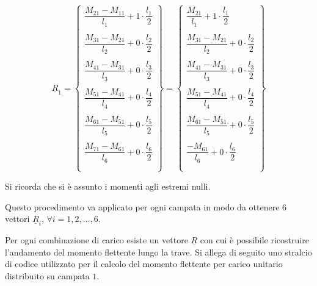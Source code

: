 \begin{equation*}
 \underline{R}_1 = \begin{Bmatrix}
    \dfrac{M_{21} - M_{11}}{l_1} + 1\cdot\dfrac{l_1}{2}\\\\
    \dfrac{M_{31} - M_{21}}{l_2} + 0\cdot\dfrac{l_2}{2}\\\\
    \dfrac{M_{41} - M_{31}}{l_3} + 0\cdot\dfrac{l_3}{2}\\\\
    \dfrac{M_{51} - M_{41}}{l_4} + 0\cdot\dfrac{l_4}{2}\\\\
    \dfrac{M_{61} - M_{51}}{l_5} + 0\cdot\dfrac{l_5}{2}\\\\
    \dfrac{M_{71} - M_{61}}{l_6} + 0\cdot\dfrac{l_6}{2}\\\\
 \end{Bmatrix} = 
 \begin{Bmatrix}
    \dfrac{M_{21}}{l_1} + 1\cdot\dfrac{l_1}{2}\\\\
    \dfrac{M_{31} - M_{21}}{l_2} + 0\cdot\dfrac{l_2}{2}\\\\
    \dfrac{M_{41} - M_{31}}{l_3} + 0\cdot\dfrac{l_3}{2}\\\\
    \dfrac{M_{51} - M_{41}}{l_4} + 0\cdot\dfrac{l_4}{2}\\\\
    \dfrac{M_{61} - M_{51}}{l_5} + 0\cdot\dfrac{l_5}{2}\\\\
    \dfrac{- M_{61}}{l_6} + 0\cdot\dfrac{l_6}{2}\\\\
 \end{Bmatrix}
\end{equation*}

Si ricorda che si è assunto i momenti agli estremi nulli.

Questo procedimento va applicato per ogni campata in modo da ottenere $6$ vettori $\underline{R}_i$, $\forall i=1, 2, \dots, 6$.

Per ogni combinazione di carico esiste un vettore $\underline{R}$ con cui è possibile ricostruire l'andamento del momento flettente lungo la trave. 
Si allega di seguito uno stralcio di codice utilizzato per il calcolo del momento flettente per carico unitario distribuito su campata $1$.

